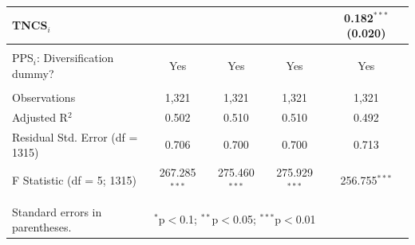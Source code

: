 \documentclass[draft,final]{vutinfth} %
\begin{document}
\begin{table}
\begin{tabularx}{\textwidth}{@{\extracolsep{\fill}}lcccc}
  TNCS$_{i}$ &  &  &  & 0.182$^{***}$ (0.020) \\ 
 \hline \\[-1.8ex] 
PPS$_{i}$: Diversification dummy? & Yes & Yes & Yes & Yes \\ 
\hline \\[-1.8ex] 
Observations & 1,321 & 1,321 & 1,321 & 1,321 \\ 
Adjusted R$^{2}$ & 0.502 & 0.510 & 0.510 & 0.492 \\ 
Residual Std. Error (df = 1315) & 0.706 & 0.700 & 0.700 & 0.713 \\ 
F Statistic (df = 5; 1315) & 267.285$^{***}$ & 275.460$^{***}$ & 275.929$^{***}$ & 256.755$^{***}$ \\ 
\hline 
\hline \\[-1.8ex] 
Standard errors in parentheses. & \multicolumn{4}{l}{$^{*}$p$<$0.1; $^{**}$p$<$0.05; $^{***}$p$<$0.01} \\ 
\end{tabularx} 
\end{table} 
\end{document}
